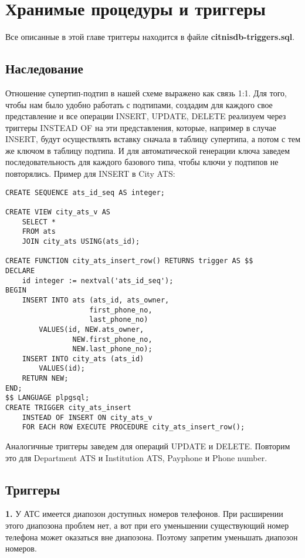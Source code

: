 \documentclass{report}
\begin{document}
\chapter{Хранимые процедуры и триггеры}

Все описанные в этой главе триггеры находится в файле 
\textbf{citnisdb-triggers.sql}.

\section{Наследование}

Отношение супертип-подтип в нашей схеме выражено как связь 1:1. 
Для того, чтобы нам было удобно работать с подтипами, создадим
для каждого свое представление и все операции INSERT, UPDATE, DELETE
реализуем через триггеры INSTEAD OF на эти представления, которые,
например в случае INSERT, будут осуществлять вставку сначала в 
таблицу супертипа, а потом с тем же ключом в таблицу подтипа.
И для автоматической генерации ключа заведем последовательность 
для каждого базового типа, чтобы ключи у подтипов не повторялись.
Пример для INSERT в City ATS:
\begin{lstlisting}
CREATE SEQUENCE ats_id_seq AS integer;

CREATE VIEW city_ats_v AS
    SELECT *
    FROM ats 
    JOIN city_ats USING(ats_id); 

CREATE FUNCTION city_ats_insert_row() RETURNS trigger AS $$
DECLARE
    id integer := nextval('ats_id_seq');
BEGIN
    INSERT INTO ats (ats_id, ats_owner, 
                    first_phone_no, 
                    last_phone_no)
        VALUES(id, NEW.ats_owner, 
                NEW.first_phone_no, 
                NEW.last_phone_no);
    INSERT INTO city_ats (ats_id)
        VALUES(id);
    RETURN NEW;
END;
$$ LANGUAGE plpgsql;
CREATE TRIGGER city_ats_insert 
    INSTEAD OF INSERT ON city_ats_v
    FOR EACH ROW EXECUTE PROCEDURE city_ats_insert_row();
\end{lstlisting}

Аналогичные триггеры заведем для операций UPDATE и DELETE. 
Повторим это для Department ATS и Institution ATS, 
Payphone и Phone number.

\section{Триггеры}

\textbf{1.} У АТС имеется диапозон доступных номеров телефонов. 
При расширении этого диапозона проблем нет, а вот при его 
уменьшении существующий номер телефона может оказаться 
вне диапозона. Поэтому запретим уменьшать диапозон номеров.
\end{document}
